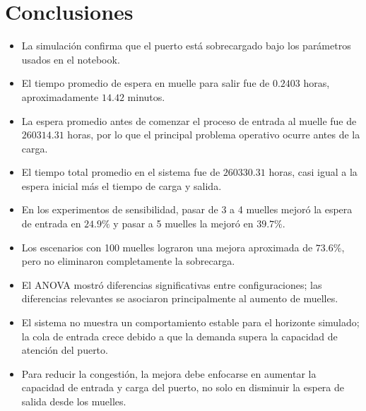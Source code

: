 \documentclass[12pt]{article}
\begin{document}
\section{Conclusiones}

\begin{itemize}
    \item La simulación confirma que el puerto está sobrecargado bajo los parámetros usados en el notebook.
    \item El tiempo promedio de espera en muelle para salir fue de $0.2403$ horas, aproximadamente $14.42$ minutos.
    \item La espera promedio antes de comenzar el proceso de entrada al muelle fue de $260314.31$ horas, por lo que el principal problema operativo ocurre antes de la carga.
    \item El tiempo total promedio en el sistema fue de $260330.31$ horas, casi igual a la espera inicial más el tiempo de carga y salida.
    \item En los experimentos de sensibilidad, pasar de 3 a 4 muelles mejoró la espera de entrada en $24.9\%$ y pasar a 5 muelles la mejoró en $39.7\%$.
    \item Los escenarios con 100 muelles lograron una mejora aproximada de $73.6\%$, pero no eliminaron completamente la sobrecarga.
    \item El ANOVA mostró diferencias significativas entre configuraciones; las diferencias relevantes se asociaron principalmente al aumento de muelles.
    \item El sistema no muestra un comportamiento estable para el horizonte simulado; la cola de entrada crece debido a que la demanda supera la capacidad de atención del puerto.
    \item Para reducir la congestión, la mejora debe enfocarse en aumentar la capacidad de entrada y carga del puerto, no solo en disminuir la espera de salida desde los muelles.
\end{itemize}
\end{document}
